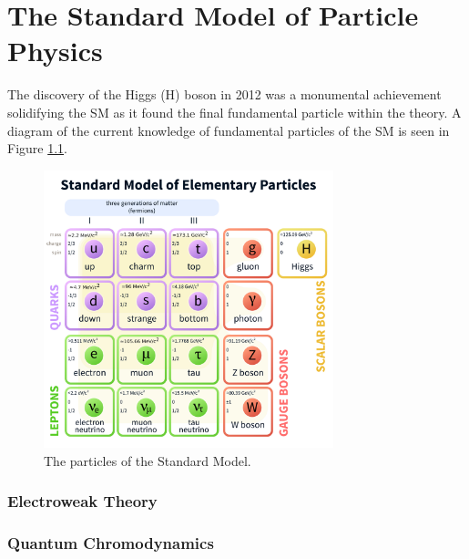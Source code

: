 \chapter{The Standard Model of Particle Physics}
\label{chap:sm}

The discovery of the Higgs (H) boson in 2012 was a monumental achievement solidifying the SM as it found the final fundamental particle within the theory.\cite{201230}  A diagram of the current knowledge of fundamental particles of the SM is seen in Figure \ref{fig:sm}.

\begin{figure}[htbp]
\centering
\includegraphics[width=0.75\textwidth]{figs/StandardModelofElementaryParticles.pdf}
\caption{The particles of the Standard Model.}
\label{fig:sm}
\end{figure}

\subsection{Electroweak Theory}
\subsection{Quantum Chromodynamics}
